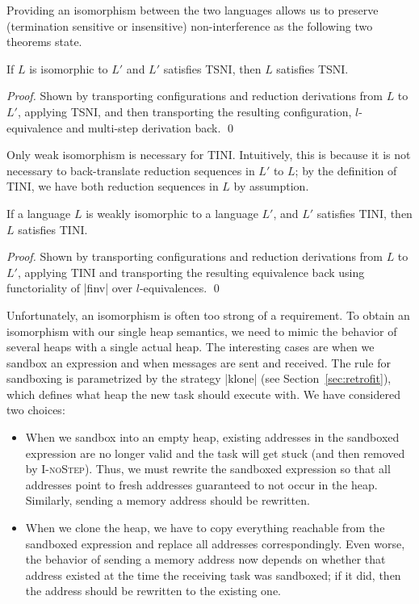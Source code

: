 Providing an isomorphism between the two languages allows us to
preserve (termination sensitive or insensitive) non-interference
as the following two theorems state.

\begin{theorem}
  \label{thm:iso-tsni}
  If $L$ is isomorphic to $L'$ and $L'$ satisfies TSNI, then
  $L$ satisfies TSNI.
\end{theorem}

\begin{proof}
  Shown by transporting configurations and reduction derivations from
  $L$ to $L'$, applying TSNI, and then transporting the
  resulting configuration, $l$-equivalence and multi-step derivation back.
  \qed
\end{proof}

Only weak isomorphism is necessary for TINI. Intuitively, this is because
it is not necessary to back-translate reduction sequences in $L'$ to
$L$; by the definition of TINI, we have both reduction sequences in $L$
by assumption.

\begin{theorem}
  \label{thm:iso-tini}
  If a language $L$ is weakly isomorphic to a language $L'$, and $L'$
  satisfies TINI, then $L$ satisfies TINI.
\end{theorem}

\begin{proof}
  Shown by transporting configurations and reduction derivations
  from $L$ to $L'$, applying TINI and transporting the resulting
  equivalence back using functoriality of |finv| over $l$-equivalences.
  \qed
\end{proof}

Unfortunately, an isomorphism is often too strong of a requirement.
To obtain an isomorphism with our single heap semantics, we need to mimic the
behavior of several heaps with a single actual heap.
The interesting cases are when we sandbox
an expression and when messages are sent and received.
The rule for sandboxing is
parametrized by the strategy |klone| (see Section~\ref{sec:retrofit}),
which defines what heap the new task
should execute with.  We have considered two choices:

\begin{itemize}
    \item When we sandbox into an empty heap, existing addresses
in the sandboxed expression are no longer valid and the
task will get stuck (and then removed by \textsc{I-noStep}).
Thus, we must rewrite the sandboxed expression so that
all addresses point to fresh addresses
guaranteed to not occur in the heap.  Similarly,
sending a memory address should be rewritten.

\item When we clone the heap, we have to copy everything
reachable from the sandboxed expression and replace all addresses
correspondingly.  Even worse, the behavior of sending a memory address
now depends on whether that address existed at the time the receiving
task was sandboxed;  if it did, then the address should be rewritten to the
existing one.
\end{itemize}

